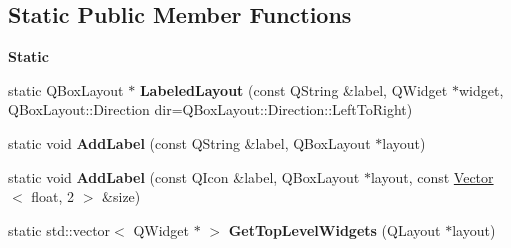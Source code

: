 \subsection*{Static Public Member Functions}
\begin{Indent}\textbf{ Static}\par
\begin{DoxyCompactItemize}
\item 
\mbox{\label{classrev_1_1_view_1_1_parameter_widget_acdce6fb04431274d6a56e3cadfaa436f}} 
static Q\+Box\+Layout $\ast$ {\bfseries Labeled\+Layout} (const Q\+String \&label, Q\+Widget $\ast$widget, Q\+Box\+Layout\+::\+Direction dir=Q\+Box\+Layout\+::\+Direction\+::\+Left\+To\+Right)
\item 
\mbox{\label{classrev_1_1_view_1_1_parameter_widget_a070227c26e3017a716b610b855cf868f}} 
static void {\bfseries Add\+Label} (const Q\+String \&label, Q\+Box\+Layout $\ast$layout)
\item 
\mbox{\label{classrev_1_1_view_1_1_parameter_widget_a42f938dd201f70b24e06d9ae284b4100}} 
static void {\bfseries Add\+Label} (const Q\+Icon \&label, Q\+Box\+Layout $\ast$layout, const \mbox{\hyperlink{classrev_1_1_vector}{Vector}}$<$ float, 2 $>$ \&size)
\item 
\mbox{\label{classrev_1_1_view_1_1_parameter_widget_aba289701b253b44b9fdac78fbfc30602}} 
static std\+::vector$<$ Q\+Widget $\ast$ $>$ {\bfseries Get\+Top\+Level\+Widgets} (Q\+Layout $\ast$layout)
\end{DoxyCompactItemize}
\end{Indent}
